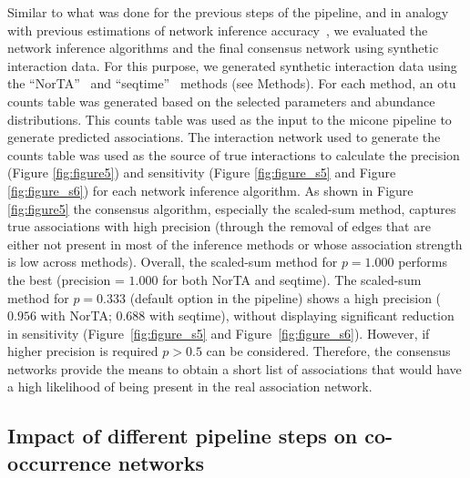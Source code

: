  Similar to what was done for the previous steps of the pipeline, and in analogy with previous estimations of network inference accuracy~\cite{Kurtz2015,Weiss2016}, we evaluated the network inference algorithms and the final consensus network using synthetic interaction data.
  For this purpose, we generated synthetic interaction data using the ``NorTA''~\cite{Kurtz2015} and ``seqtime''~\cite{faustSignaturesEcologicalProcesses2018} methods (see Methods).
  For each method, an \ac{otu} counts table was generated based on the selected parameters and abundance distributions.
  This counts table was used as the input to the \ac{micone} pipeline to generate predicted associations.
  The interaction network used to generate the counts table was used as the source of true interactions to calculate the precision (Figure \ref{fig:figure5}) and sensitivity (Figure \ref{fig:figure_s5} and Figure \ref{fig:figure_s6}) for each network inference algorithm.
  As shown in Figure \ref{fig:figure5} the consensus algorithm, especially the scaled-sum method, captures true associations with high precision (through the removal of edges that are either not present in most of the inference methods or whose association strength is low across methods).
  Overall, the scaled-sum method for $p=1.000$ performs the best (precision = $1.000$ for both NorTA and seqtime).
  The scaled-sum method for $p=0.333$ (default option in the pipeline) shows a high precision ($0.956$ with NorTA; $0.688$ with seqtime), without displaying significant reduction in sensitivity (Figure~\ref{fig:figure_s5} and Figure~\ref{fig:figure_s6}).
  However, if higher precision is required $p>0.5$ can be considered.
  Therefore, the consensus networks provide the means to obtain a short list of associations that would have a high likelihood of being present in the real association network.

  \FloatBarrier

  \subsection*{Impact of different pipeline steps on co-occurrence networks}

